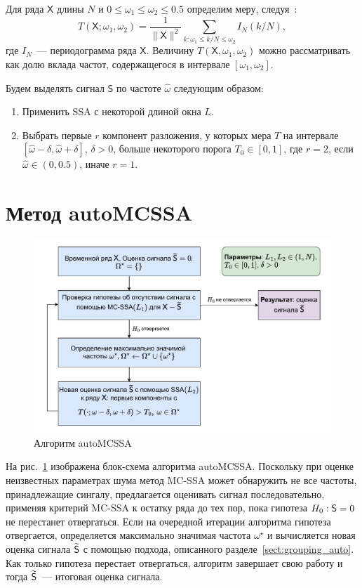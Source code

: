 \documentclass[specialist,
substylefile = spbu_report.rtx,
subf,href,colorlinks=true, 12pt]{disser}
\theoremstyle{definition}
\begin{document}
Для ряда $\mathsf{X}$ длины $N$ и $0\leqslant\omega_1\leqslant\omega_2\leqslant0.5$ определим меру, следуя~\cite{Alexandrov2009}:
\begin{equation}\label{eq:freq_measure}
T(\mathsf{X};\omega_1,\omega_2)=\frac{1}{\|\mathsf{X}\|^2}\sum_{k:\omega_1\leqslant k/N\leqslant \omega_2}I_N(k/N),
\end{equation}
где $I_N$~--- периодограмма ряда $\mathsf{X}$. Величину $T(\mathsf{X},\omega_1,\omega_2)$ можно рассматривать как долю вклада частот, содержащегося в интервале $[\omega_1,\omega_2]$.

Будем выделять сигнал $\mathsf{S}$ по частоте $\hat \omega$ следующим образом:
\begin{enumerate}
    \item Применить SSA с некоторой длиной окна $L$.
    \item Выбрать первые $r$ компонент разложения, у которых мера $T$ на интервале $[\hat\omega-\delta, \hat\omega+\delta]$, $\delta>0$, больше некоторого порога $T_0\in[0, 1]$, где $r=2$, если $\hat\omega\in(0, 0.5)$, иначе $r=1$. 
\end{enumerate}

\section{Метод autoMCSSA}\label{sect:autoMCSSA}

\begin{figure}[htbp]
    \centering
    \includegraphics[width=\textwidth]{img/auto_mcssa_alg.pdf}
    \caption{Алгоритм autoMCSSA}
    \label{fig:autoMCSSA_alg}
\end{figure}

На рис.~\ref{fig:autoMCSSA_alg} изображена блок-схема алгоритма autoMCSSA. Поскольку при оценке неизвестных параметрах шума метод MC-SSA может обнаружить не все частоты, принадлежащие сингалу, предлагается оценивать сигнал последовательно, применяя критерий MC-SSA к остатку ряда до тех пор, пока гипотеза $H_0:\mathsf{S}=0$ не перестанет отвергаться. Если на очередной итерации алгоритма гипотеза отвергается, определяется максимально значимая частота $\omega^\star$ и вычисляется новая оценка сигнала $\widetilde{\mathsf{S}}$ с помощью подхода, описанного разделе~\ref{sect:grouping_auto}. Как только гипотеза перестает отвергаться, алгоритм завершает свою работу и тогда $\widetilde{\mathsf{S}}$~--- итоговая оценка сигнала.
\end{document}
